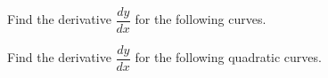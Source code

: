 \documentclass[12pt, a4paper, addpoints]{exam}
\newcommand{\ts}{\vspace{6 mm}}
\begin{document}
\begin{questions}
\question Find the derivative $\dfrac{dy}{dx}$ for the following curves.
\setlength{\columnsep}{11pt}
\begin{multicols}{4}
\end{multicols}

\ts


\question Find the derivative $\dfrac{dy}{dx}$ for the following quadratic curves.
\setlength{\columnsep}{11pt}
\begin{multicols}{5}
\end{multicols}


\end{questions}
\end{document}

